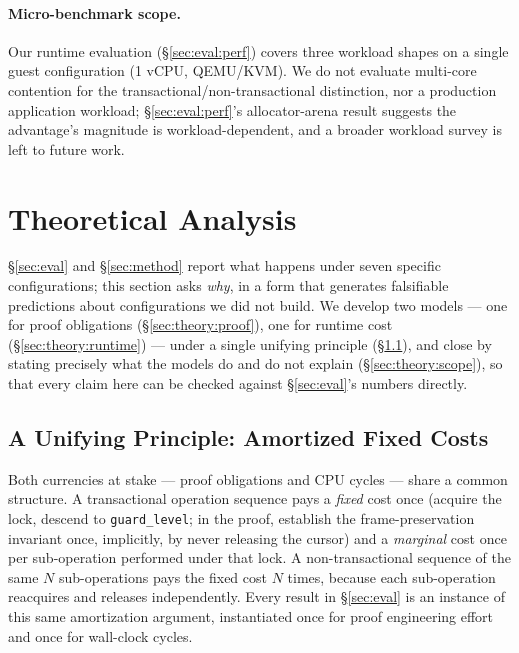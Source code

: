 \documentclass[10pt]{article}
\newcommand{\vfn}[1]{\texttt{#1}}
\begin{document}
\paragraph{Micro-benchmark scope.} Our runtime evaluation
(\S\ref{sec:eval:perf}) covers three workload shapes on a single guest
configuration (1 vCPU, QEMU/KVM). We do not evaluate multi-core
contention for the transactional/non-transactional distinction, nor a
production application workload; \S\ref{sec:eval:perf}'s allocator-arena
result suggests the advantage's magnitude is workload-dependent, and a
broader workload survey is left to future work.



\section{Theoretical Analysis}
\label{sec:theory}

\S\ref{sec:eval} and \S\ref{sec:method} report what happens under seven
specific configurations; this section asks \emph{why}, in a form that
generates falsifiable predictions about configurations we did not
build. We develop two models --- one for proof obligations
(\S\ref{sec:theory:proof}), one for runtime cost
(\S\ref{sec:theory:runtime}) --- under a single unifying principle
(\S\ref{sec:theory:principle}), and close by stating precisely what the
models do and do not explain (\S\ref{sec:theory:scope}), so that every
claim here can be checked against \S\ref{sec:eval}'s numbers directly.

\subsection{A Unifying Principle: Amortized Fixed Costs}
\label{sec:theory:principle}

Both currencies at stake --- proof obligations and CPU cycles --- share
a common structure. A transactional operation sequence pays a
\emph{fixed} cost once (acquire the lock, descend to
\vfn{guard\_level}; in the proof, establish the frame-preservation
invariant once, implicitly, by never releasing the cursor) and a
\emph{marginal} cost once per sub-operation performed under that lock.
A non-transactional sequence of the same $N$ sub-operations pays the
fixed cost $N$ times, because each sub-operation reacquires and
releases independently. Every result in \S\ref{sec:eval} is an instance
of this same amortization argument, instantiated once for proof
engineering effort and once for wall-clock cycles.
\end{document}
